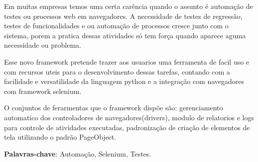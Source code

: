 %
%

\begin{RESUMO}
\thispagestyle{empty}
	\begin{SingleSpace}


		Em muitas empresas temos uma certa carência quando o assunto é automação de testes ou processos web em navegadores. A necessidade de testes de regressão, testes de funcionalidades e ou
        automação de processos cresce junto com o sistema, porem a pratica dessas atividades só tem força quando aparece aguma necessidade ou problema.

        Esse novo framework pretende trazer aos usuarios uma ferramenta de facil uso e com recursos uteis para o desenvolvimento dessas tarefas, contando com a facilidade e versatilidade da
        linguagem python e a integração com navegadores com framework selenium.

        O conjuntos de ferarmentas que o framework dispõe são: gerenciamento automatico dos controladores de navegadores(drivers), modulo de relatorios e logs para controle de atividades executadas,
        padronização de criação de elementos de tela utilizando o padrão PageObject.

		\vspace*{0.5cm}\hspace{-1.3 cm}\textbf{Palavras-chave}: Automação, Selenium, Testes.

	\end{SingleSpace}
\end{RESUMO}



